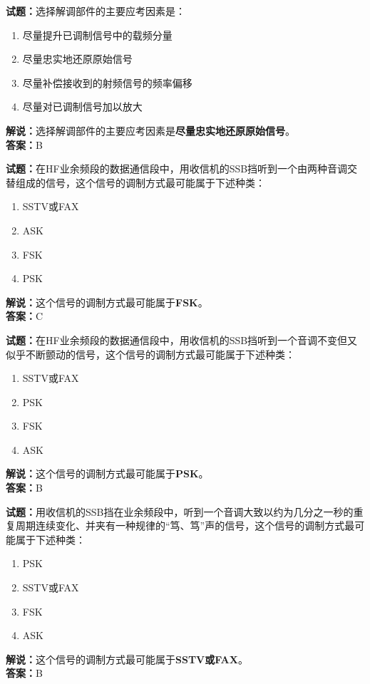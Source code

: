 \documentclass{ctexbook}
\begin{document}
\bigskip


\noindent\textbf{试题：}选择解调部件的主要应考因素是：
\begin{enumerate}[leftmargin=3em]
\item 尽量提升已调制信号中的载频分量
\item 尽量忠实地还原原始信号
\item 尽量补偿接收到的射频信号的频率偏移
\item 尽量对已调制信号加以放大
\end{enumerate}
\noindent\textbf{解说：}选择解调部件的主要应考因素是\textbf{尽量忠实地还原原始信号}。\\\noindent\textbf{答案：}B




\bigskip


\noindent\textbf{试题：}在HF业余频段的数据通信段中，用收信机的SSB挡听到一个由两种音调交替组成的信号，这个信号的调制方式最可能属于下述种类：
\begin{enumerate}[leftmargin=3em]
\item SSTV或FAX
\item ASK
\item FSK
\item PSK
\end{enumerate}
\noindent\textbf{解说：}这个信号的调制方式最可能属于\textbf{FSK}。\\\noindent\textbf{答案：}C




\bigskip


\noindent\textbf{试题：}在HF业余频段的数据通信段中，用收信机的SSB挡听到一个音调不变但又似乎不断颤动的信号，这个信号的调制方式最可能属于下述种类：
\begin{enumerate}[leftmargin=3em]
\item SSTV或FAX
\item PSK
\item FSK
\item ASK
\end{enumerate}
\noindent\textbf{解说：}这个信号的调制方式最可能属于\textbf{PSK}。\\\noindent\textbf{答案：}B




\bigskip


\noindent\textbf{试题：}用收信机的SSB挡在业余频段中，听到一个音调大致以约为几分之一秒的重复周期连续变化、并夹有一种规律的“笃、笃”声的信号，这个信号的调制方式最可能属于下述种类：
\begin{enumerate}[leftmargin=3em]
\item PSK
\item SSTV或FAX
\item FSK
\item ASK
\end{enumerate}
\noindent\textbf{解说：}这个信号的调制方式最可能属于\textbf{SSTV或FAX}。\\\noindent\textbf{答案：}B
\end{document}

